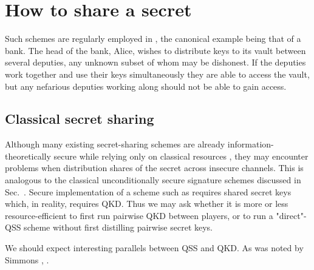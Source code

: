 \section{How to share a secret}
Such schemes are regularly employed in , the canonical example being that of a bank. The head of the bank, Alice, wishes to distribute keys to its vault between several deputies, any unknown subset of whom may be dishonest. If the deputies work together and use their keys simultaneously they are able to access the vault, but any nefarious deputies working along should not be able to gain access.

\subsection*{Classical secret sharing}
Although many existing secret-sharing schemes are already information-theoretically secure while relying only on classical resources , they may encounter problems when distribution shares of the secret across insecure channels.  This is analogous to the classical unconditionally secure signature schemes discussed in Sec.~. Secure implementation of a scheme such as  requires shared secret keys which, in reality, requires QKD. Thus we may ask whether it is more or less resource-efficient to first run pairwise QKD between players, or to run a "direct"-QSS scheme without first distilling pairwise secret keys.

We should expect interesting parallels between QSS and QKD. As was noted by Simmons , .



